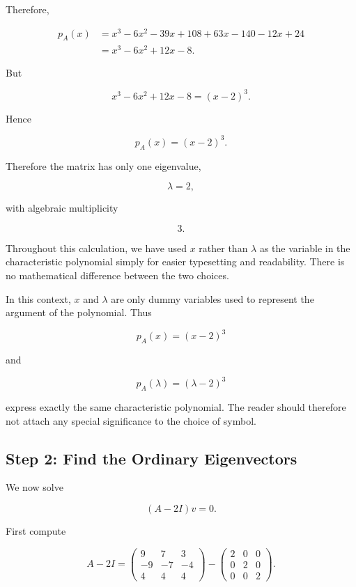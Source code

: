 \documentclass[11pt]{article}
\begin{document}
Therefore,

\[
\begin{aligned}
p_A(x)
&=
x^3-6x^2-39x+108
+63x-140
-12x+24\\
&=
x^3-6x^2+12x-8.
\end{aligned}
\]

But

\[
x^3-6x^2+12x-8=(x-2)^3.
\]

Hence

\[
\boxed{
p_A(x)=(x-2)^3.
}
\]

Therefore the matrix has only one eigenvalue,

\[
\boxed{
\lambda=2,
}
\]

with algebraic multiplicity

\[
\boxed{
3.
}
\]

Throughout this calculation, we have used \(x\) rather than
\(\lambda\) as the variable in the characteristic polynomial simply
for easier typesetting and readability.  There is no mathematical
difference between the two choices.

In this context, \(x\) and \(\lambda\) are only dummy variables used
to represent the argument of the polynomial.  Thus

\[
p_A(x)=(x-2)^3
\]

and

\[
p_A(\lambda)=(\lambda-2)^3
\]

express exactly the same characteristic polynomial.  The reader should
therefore not attach any special significance to the choice of symbol.


\subsection{Step 2: Find the Ordinary Eigenvectors}

We now solve

\[
(A-2I)v=0.
\]

First compute

\[
A-2I
=
\begin{pmatrix}
9&7&3\\
-9&-7&-4\\
4&4&4
\end{pmatrix}
-
\begin{pmatrix}
2&0&0\\
0&2&0\\
0&0&2
\end{pmatrix}.
\]
\end{document}
